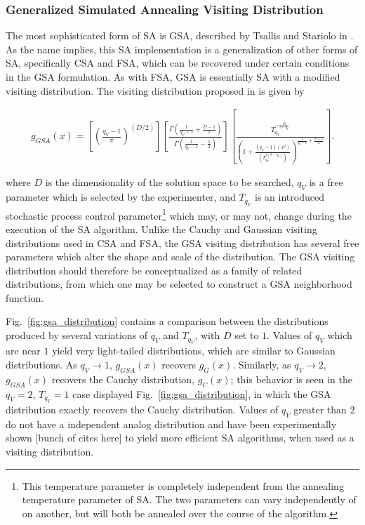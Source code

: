 \documentclass[11pt]{afthesis}
\begin{document}
	  
	
	 

	

	\subsubsection{Generalized Simulated Annealing Visiting Distribution}
	
	The most sophisticated form of SA is GSA, described by Tsallis and Stariolo in \cite{tsallis1996generalizedsimulatedannealing}. As the name implies, this SA implementation is a generalization of other forms of SA, specifically CSA and FSA, which can be recovered under certain conditions in the GSA formulation. As with FSA, GSA is essentially SA with a modified visiting distribution. The visiting distribution proposed in \cite{tsallis1996generalizedsimulatedannealing} is given by 
	
	\begin{align}\label{eq:gsa_visiting_distribution}
		g_{GSA}(x) = \left[ \left(\frac{q_V-1}{\pi}\right)^{(D/2)} \right]
		\left[ \frac{\Gamma \left( \frac{1}{q_V-1}+\frac{D-1}{2} \right) }{\Gamma \left( \frac{1}{q_V-1}-\frac{1}{2} \right)} \right]
		\left[ \frac{T_{q_V}^{-\frac{D}{3-q_V}}}{\left( 1+\frac{(q_V-1)(x^2)}{\left(T_{q_V}^{2(3-q_V)}\right)}\right)^{\frac{1}{q_V-1}+\frac{D-1}{2}} } \right].
	\end{align}
	
	\noindent where $D$ is the dimensionality of the solution space to be searched, $q_V$ is a free parameter which is selected by the experimenter, and $T_{q_V}$ is an introduced stochastic process control parameter\footnote{This temperature parameter is completely independent from the annealing temperature parameter of SA. The two parameters can vary independently of on another, but will both be annealed over the course of the algorithm.} which may, or may not, change during the execution of the SA algorithm. Unlike the Cauchy and Gaussian visiting distributions used in CSA and FSA, the GSA visiting distribution has several free parameters which alter the shape and scale of the distribution. The GSA visiting distribution should therefore be conceptualized as a family of related distributions, from which one may be selected to construct a GSA neighborhood function. 
	
	Fig.~\ref{fig:gsa_distribution} contains a comparison between the distributions produced by several variations of $q_V$ and $T_{q_V}$, with $D$ set to $1$. Values of $q_V$ which are near $1$ yield very light-tailed distributions, which are similar to Gaussian distributions. As $q_V \rightarrow 1$, $g_{GSA}(x)$ recovers $g_{G}(x)$. Similarly, as $q_V \rightarrow 2$, $g_{GSA}(x)$ recovers the Cauchy distribution, $g_{C}(x)$; this behavior is seen in the $q_V=2$, $T_{q_V}=1$ case displayed Fig.~\ref{fig:gsa_distribution}, in which the GSA distribution exactly recovers the Cauchy distribution. Values of $q_V$ greater than $2$ do not have a independent analog distribution and have been experimentally shown [bunch of cites here] to yield more efficient SA algorithms, when used as a visiting distribution. 	
	
\end{document}
